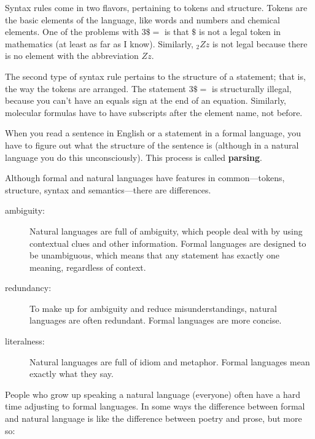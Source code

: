 \documentclass[12pt]{book}
\theoremstyle{definition}
\begin{document}
Syntax rules come in two flavors, pertaining to tokens and structure.
Tokens are the basic elements of the language, like words and numbers
and chemical elements.  One of the problems with $3 \$ =$ is that
$\$$ is not a legal token in mathematics (at least as far as I
know).  Similarly, $_2Zz$ is not legal because there is no element with
the abbreviation $Zz$.

The second type of syntax rule pertains to the structure of a
statement; that is, the way the tokens are arranged.  The statement
$3 \$ =$ is structurally illegal, because you can't have an equals
sign at the end of an equation.  Similarly, molecular formulas
have to have subscripts after the element name, not before.

When you read a sentence in English or a statement in a formal
language, you have to figure out what the structure of the sentence is
(although in a natural language you do this unconsciously).  This
process is called {\bf parsing}.


Although formal and natural languages have features in
common---tokens, structure, syntax and semantics---there are
differences.


\begin{description}

\item[ambiguity:] Natural languages are full of ambiguity, which
  people deal with by using contextual clues and other information.
  Formal languages are designed to be unambiguous, which means that
  any statement has exactly one meaning, regardless of context.

\item[redundancy:] To make up for ambiguity and reduce
  misunderstandings, natural languages are often redundant.  Formal
  languages are more concise.

\item[literalness:] Natural languages are full of idiom and
metaphor.  Formal languages mean exactly what they say.

\end{description}

People who grow up speaking a natural language (everyone) often have a
hard time adjusting to formal languages.  In some ways the difference
between formal and natural language is like the difference between
poetry and prose, but more so:
\end{document}
